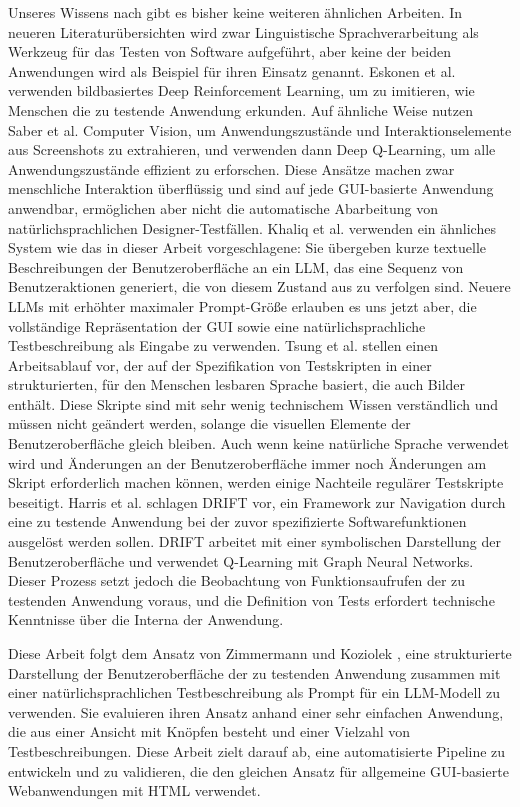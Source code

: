 Unseres Wissens nach gibt es bisher keine weiteren ähnlichen Arbeiten.
In neueren Literaturübersichten wird zwar Linguistische Sprachverarbeitung als Werkzeug für das Testen von Software aufgeführt, aber keine der beiden Anwendungen wird als Beispiel für ihren Einsatz genannt. \cite{implementation_verma_2023, machine_fontes_2021}
Eskonen et al. verwenden bildbasiertes Deep Reinforcement Learning, um zu imitieren, wie Menschen die zu testende Anwendung erkunden. \cite{deep_reinforcement_exploring}
Auf ähnliche Weise nutzen Saber et al. Computer Vision, um Anwendungszustände und Interaktionselemente aus Screenshots zu extrahieren, und verwenden dann Deep Q-Learning, um alle Anwendungszustände effizient zu erforschen. 
Diese Ansätze machen zwar menschliche Interaktion überflüssig und sind auf jede GUI-basierte Anwendung anwendbar, ermöglichen aber nicht die automatische Abarbeitung von natürlichsprachlichen Designer-Testfällen. \cite{saber_testing}
Khaliq et al. verwenden ein ähnliches System wie das in dieser Arbeit vorgeschlagene: Sie übergeben kurze textuelle Beschreibungen der Benutzeroberfläche an ein LLM, das eine Sequenz von Benutzeraktionen generiert, die von diesem Zustand aus zu verfolgen sind. \cite{transformers_exploratory}
Neuere LLMs mit erhöhter maximaler Prompt-Größe erlauben es uns jetzt aber, die vollständige Repräsentation der GUI sowie eine natürlichsprachliche Testbeschreibung als Eingabe zu verwenden.
Tsung et al. stellen einen Arbeitsablauf vor, der auf der Spezifikation von Testskripten in einer strukturierten, für den Menschen lesbaren Sprache basiert, die auch Bilder enthält. \cite{tsung}
Diese Skripte sind mit sehr wenig technischem Wissen verständlich und müssen nicht geändert werden, solange die visuellen Elemente der Benutzeroberfläche gleich bleiben.
Auch wenn keine natürliche Sprache verwendet wird und Änderungen an der Benutzeroberfläche immer noch Änderungen am Skript erforderlich machen können, werden einige Nachteile regulärer Testskripte beseitigt.
Harris et al. schlagen DRIFT vor, ein Framework zur Navigation durch eine zu testende Anwendung bei der zuvor spezifizierte Softwarefunktionen ausgelöst werden sollen. \cite{harries2020drift}
DRIFT arbeitet mit einer symbolischen Darstellung der Benutzeroberfläche und verwendet Q-Learning mit Graph Neural Networks.
Dieser Prozess setzt jedoch die Beobachtung von Funktionsaufrufen der zu testenden Anwendung voraus, und die Definition von Tests erfordert technische Kenntnisse über die Interna der Anwendung.

Diese Arbeit folgt dem Ansatz von Zimmermann und Koziolek \cite{GPT3Testing}, eine strukturierte Darstellung der Benutzeroberfläche der zu testenden Anwendung zusammen mit einer natürlichsprachlichen Testbeschreibung als Prompt für ein LLM-Modell zu verwenden.
Sie evaluieren ihren Ansatz anhand einer sehr einfachen Anwendung, die aus einer Ansicht mit Knöpfen besteht und einer Vielzahl von Testbeschreibungen.
Diese Arbeit zielt darauf ab, eine automatisierte Pipeline zu entwickeln und zu validieren, die den gleichen Ansatz für allgemeine GUI-basierte Webanwendungen mit HTML verwendet.


